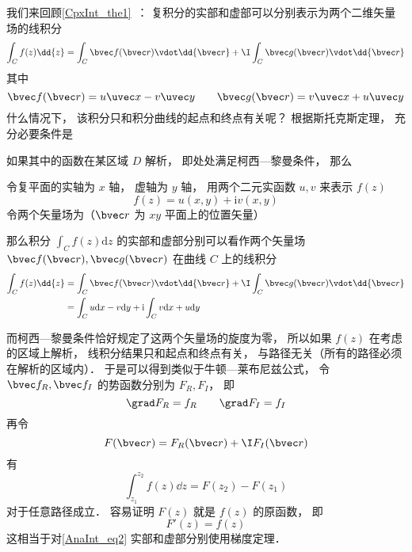 
\begin{issues}
\issueDraft
\end{issues}


我们来回顾\autoref{CpxInt_the1}~： 复积分的实部和虚部可以分别表示为两个二维矢量场的线积分
\begin{equation}
\int_{C} f(z) \dd{z} = \int_C \bvec f(\bvec r) \vdot \dd{\bvec r} + \I \int_C \bvec g(\bvec r) \vdot \dd{\bvec r}
\end{equation}
其中
\begin{equation}
\bvec f(\bvec r) = u\uvec x - v\uvec y
\qquad
\bvec g(\bvec r) = v\uvec x + u\uvec y
\end{equation}
什么情况下， 该积分只和积分曲线的起点和终点有关呢？ 根据斯托克斯定理， 充分必要条件是

如果其中的函数在某区域 $D$ 解析， 即处处满足柯西—黎曼条件， 那么


\begin{theorem}{}
令复平面的实轴为 $x$ 轴， 虚轴为 $y$ 轴， 用两个二元实函数 $u, v$ 来表示 $f(z)$
\begin{equation}
f (z) = u(x, y) + \mathrm iv(x, y)
\end{equation}
令两个矢量场为（$\bvec r$ 为 $xy$ 平面上的位置矢量）

那么积分 $\int_{C} f(z) \mathrm{d} z$ 的实部和虚部分别可以看作两个矢量场 $\bvec f(\bvec r), \bvec g(\bvec r)$ 在曲线 $C$ 上的线积分
\begin{equation}
\begin{aligned}
\int_{C} f(z) \dd{z} &= \int_C \bvec f(\bvec r) \vdot \dd{\bvec r} + \I \int_C \bvec g(\bvec r) \vdot \dd{\bvec r}\\
&= \int_{C} u \mathrm{d} x-v \mathrm{d} y+\mathrm{i} \int_{C} v \mathrm{d} x+u \mathrm{d} y
\end{aligned}
\end{equation}
\end{theorem}

而柯西—黎曼条件恰好规定了这两个矢量场的旋度为零， 所以如果 $f(z)$ 在考虑的区域上解析， 线积分结果只和起点和终点有关， 与路径无关（所有的路径必须在解析的区域内）． 于是可以得到类似于牛顿—莱布尼兹公式， 令 $\bvec f_R, \bvec f_I$ 的势函数分别为 $F_R, F_I$， 即
\begin{equation}
\grad F_R = f_R
\qquad
\grad F_I = f_I
\end{equation}
再令
\begin{equation}
F(\bvec r) = F_R(\bvec r) + \I F_I(\bvec r)
\end{equation}
有
\begin{equation}\label{AnaInt_eq2}
\int_{z_1}^{z_2} f(z) \dd{z} = F(z_2) - F(z_1)
\end{equation}
对于任意路径成立． 容易证明 $F(z)$ 就是 $f(z)$ 的原函数， 即
\begin{equation}
F'(z) = f(z)
\end{equation}
这相当于对\autoref{AnaInt_eq2} 实部和虚部分别使用梯度定理．
